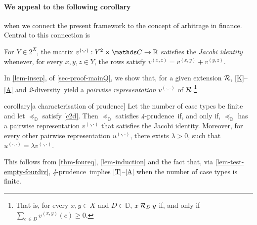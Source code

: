 \documentclass[12pt,a4paper,twoside]{article}
\newcommand{\countof}{\mathbin{\sharp}\hskip1pt}
\newcommand{\ext}{\mathrel{\mc R}}
\newcommand{\extb}{\mathbin{\mc R}}
\newcommand{\mbbd}{{\mathds D}}
\newcommand{\mbbc}{{\mathds C}}
\newcommand{\xy}{{(x, y)}}
\newcommand{\yz}{{(y,z)}}
\newcommand{\xz}{{(x,z)}}
\newcommand{\dd}{{(\cdot,\cdot)}}
\newcommand{\fourpru}{\textit{4}-\textup{prudence}}
\newcommand{\twodiv}{\textit{2}-\textup{diversity}}
\begin{document}
\paragraph{We appeal to the following corollary}\hskip-7pt
when we connect the present framework to the concept of arbitrage in finance. Central to this connection is
\begin{definition} %

  For $ Y \in 2 ^ { X } $, the matrix
  $ v^{ \dd } : Y^{2}\times \mbbc \rightarrow \R $ satisfies the \emph{Jacobi
    identity} whenever, for every $ x , y , z \in Y $, the rows satisfy
  $ v ^{ \xz } = v ^{ \xy } + v ^{ \yz }$.
\end{definition}
In \cref{lem-insep}, of \cref{sec-proof-mainQ}, we show that, for a given
extension $\ext$, \ref{K}--\ref{A} and \twodiv\ yield a \emph{pairwise
  representation} $v^{\dd}$ of $ \ext $.\footnote{That is, for every $x,y\in X$
  and $D \in \mbbd$, $x \extb_{D} y$ if, and only if
  $ \sum_{c \,\in D}v^{\xy}(c) \geq 0$.} %

   
\begin{theoremEnd}{corollary}[a characterisation of
  prudence]\label{cor-foureq}
   Let the number of case types be finite and let $\preceq_{\mbbd}$ satisfy
   \ref{c2d}. Then $\preceq_{\mbbd}$ satisfies \fourpru\ if, and only if,
   $\preceq_{\mbbd}$ has a pairwise representation $v^{\dd}$ that satisfies the
   Jacobi identity. Moreover, for every other pairwise representation
   $u^{\dd} $, there exists $\lambda >0$, such that $u^{\dd} = \lambda v^{\dd}$.
 \end{theoremEnd}
 \begin{proofEnd}%
   This follows from \cref{thm-foureq}, \cref{lem-induction} and the fact
   that, via \cref{lem-test-empty-fourdiv}, \fourpru\ implies \ref{T}--\ref{A} when
   the number of case types is finite. \label{proof-cor-foureq}
\end{proofEnd}
\end{document}
